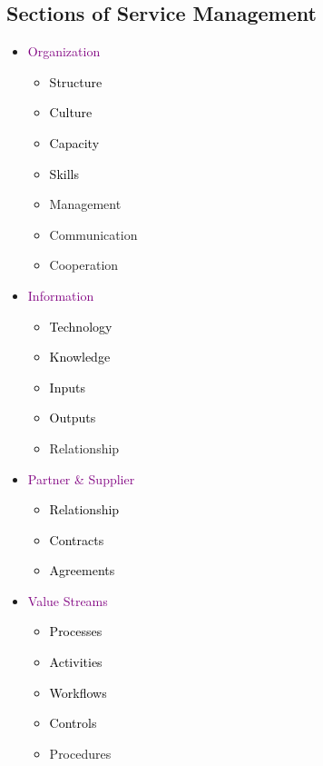 \documentclass[main.tex,fontsize=12pt,paper=a4,paper=landscape,DIV=calc,]{scrartcl}
\begin{document}
\begin{multicols*}{2}
\subsection{Sections of Service Management}
\begin{itemize}
\item \textcolor{purple}{Organization}\newline
  \begin{itemize}
  \item \textcolor{black}{Structure}
  \item \textcolor{black}{Culture}
  \item \textcolor{black}{Capacity}
  \item \textcolor{black}{Skills}
  \item Management
  \item Communication
  \item Cooperation
  \end{itemize} 
\item \textcolor{purple}{Information}\newline
  \begin{itemize}
  \item \textcolor{black}{Technology}
  \item \textcolor{black}{Knowledge}
  \item \textcolor{black}{Inputs}
  \item \textcolor{black}{Outputs}
  \item Relationship
  \end{itemize} 
\item \textcolor{purple}{Partner \& Supplier}\newline
  \begin{itemize}
  \item \textcolor{black}{Relationship}
  \item \textcolor{black}{Contracts}
  \item \textcolor{black}{Agreements}
  \end{itemize} 
\item \textcolor{purple}{Value Streams}\newline
  \begin{itemize}
  \item \textcolor{black}{Processes}
  \item \textcolor{black}{Activities}
  \item \textcolor{black}{Workflows}
  \item \textcolor{black}{Controls}
  \item Procedures
  \end{itemize} 
\end{itemize} 


\end{multicols*}
\end{document}
